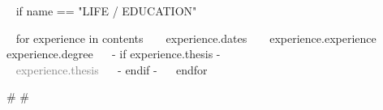 
\medskip

\selectfont



\begin{minipage}{\textwidth}

~{ if name == "LIFE / EDUCATION" }~
  \begin{entrylist}
  ~{ for experience in contents }~
      \entry
        {~{{ experience.dates }}~} %
        {~{{ experience.experience }}~} %
        {} %
        {~{{ experience.degree }}~ 
        ~{- if experience.thesis -}~ \\ \textcolor{gray}{~{{ experience.thesis }}~} ~{- endif -}~
        } %
  ~{ endfor }~
  \end{entrylist}


{# 
#}




\end{minipage}
